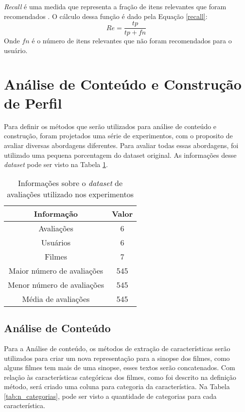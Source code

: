 \textit{Recall} é uma medida que representa a fração de itens relevantes que foram recomendados \cite{olson2008advanced}. O cálculo dessa função é dado pela Equação \ref{recall}:
\begin{equation}
\label{recall}
    Re = \frac{tp}{tp + fn} 
\end{equation}
Onde \(fn\) é o número de itens relevantes que não foram recomendados para o usuário.
\section{Análise de Conteúdo e Construção de Perfil}
Para definir os métodos que serão utilizados para análise de conteúdo e construção, foram projetados uma série de experimentos, com o proposito de avaliar diversas abordagens diferentes. Para avaliar todas essas abordagens, foi utilizado uma pequena porcentagem do dataset original. As informações desse \textit{dataset} pode ser visto na Tabela \ref{tab:exp_ac_cp}.

\begin{table}[h]
\label{tab:exp_ac_cp}
 \centering
\begin{tabular}{|c| c |}
\hline
Informação &  Valor \\ 
\hline
Avaliações & 6  \\ 
\hline
Usuários & 6 \\ 
\hline
Filmes & 7 \\
\hline
Maior número de avaliações & 545  \\
\hline
Menor número de avaliações & 545 \\
\hline
Média de avaliações & 545  \\
\hline    
\end{tabular}
\caption{\label{tab:exp_ac_cp}Informações sobre o \textit{dataset} de avaliações utilizado nos experimentos}
\end{table}
\subsection{Análise de Conteúdo}

Para a Análise de conteúdo, os métodos de extração de características serão utilizados para criar um nova representação para a sinopse dos filmes, como alguns filmes tem mais de uma sinopse, esses textos serão concatenados. Com relação às características categóricas dos filmes, como foi descrito na definição método, será criado uma coluna para categoria da característica. Na Tabela \ref{tab:n_categorias}, pode ser visto a quantidade de categorias para cada característica.

